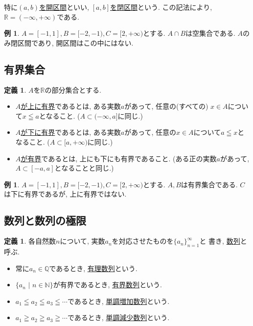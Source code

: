 \documentclass[dvipdfmx,a4paper,11pt]{article}
\newcommand{\R}{\mathbb{R}}
\newcommand{\Q}{\mathbb{Q}}
\newcommand{\N}{\mathbb{N}}
\theoremstyle{definition}
\newtheorem{dfn}[thm]{定義}
\newtheorem{exa}[thm]{例}
\begin{document}
特に\underline{$(a,b)$を開区間}といい, \underline{$ [a,b]$を閉区間}という.
この記法により, $\R = (- \infty, + \infty)$である.

\begin{exa}
$A=[-1, 1], B =[-2, -1), C=[2, +\infty)$とする.
$A \cap B $は空集合である. $A$のみ閉区間であり, 開区間はこの中にはない.
\end{exa}

\subsection{有界集合}

 \begin{tcolorbox}[
    colback = white,
    colframe = green!35!black,
    fonttitle = \bfseries,
    breakable = true]
    \begin{dfn}
$A$を$\R$の部分集合とする.
\begin{itemize}
\item \underline{$A$が上に有界}であるとは, ある実数$a$があって, 任意の(すべての) $x \in A$について$x \leqq a$となること. ($A \subset (- \infty, a]$に同じ.)
\item \underline{$A$が下に有界}であるとは, ある実数$a$があって, 任意の$x \in A$について$a \leqq x$となること. ($A \subset [a, +\infty)$に同じ.)
\item \underline{$A$が有界}であるとは, 上にも下にも有界であること. (ある正の実数$a$があって, $A \subset [-a, a]$となることと同じ.)
\end{itemize}

 \end{dfn}
 \end{tcolorbox}
 
 \begin{exa}
$A=[-1, 1], B =[-2, -1), C=[2, +\infty)$とする.
$A, B $は有界集合である. 
$C$は下に有界であるが, 上に有界ではない.
\end{exa}

\subsection{数列と数列の極限}


 \begin{tcolorbox}[
    colback = white,
    colframe = green!35!black,
    fonttitle = \bfseries,
    breakable = true]
    \begin{dfn}
各自然数$n$について, 実数$a_n$を対応させたものを$\{a_n\}_{n=1}^{\infty}$と
書き, \underline{数列}と呼ぶ.
\begin{itemize}
\item 常に$a_n \in \Q$であるとき, \underline{有理数列}という.
\item $\{ a_n \,\,|\,\, n \in \N \} $が有界であるとき, \underline{有界数列}という.
\item $a_1 \leqq a_2 \leqq a_3 \leqq \cdots $であるとき, \underline{単調増加数列}という.
\item $a_1 \geqq a_2 \geqq a_3 \geqq \cdots $であるとき, \underline{単調減少数列}という.
\end{itemize}

 \end{dfn}
 \end{tcolorbox}
  
\end{document}
